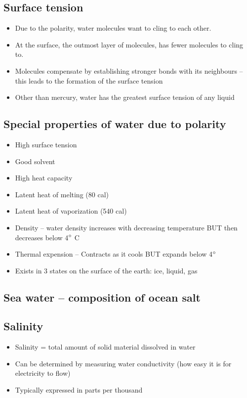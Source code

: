 \subsection{Surface tension}

\begin{itemize}
    \item Due to the polarity, water molecules want to cling
        to each other.
    \item At the surface, the outmost layer of molecules, has fewer
        molecules to cling to.
    \item Molecules compensate by establishing stronger bonds with its
        neighbours -- this leads to the formation of the surface tension
    \item Other than mercury, water has the greatest surface tension of
        any liquid
\end{itemize}

\subsection{Special properties of water due to polarity}

\begin{itemize}
    \item High surface tension
    \item Good solvent
    \item High heat capacity
    \item Latent heat of melting (80 cal)
    \item Latent heat of vaporization (540 cal)
    \item Density -- water density increases with decreasing temperature
        BUT then decreases below 4$\degree$ C
    \item Thermal expension -- Contracts as it cools BUT expands
        below 4$\degree$
    \item Exists in 3 states on the surface of the earth: ice, liquid, gas
\end{itemize}

\subsection{Sea water -- composition of ocean salt}

\subsection{Salinity}

\begin{itemize}
    \item Salinity = total amount of solid material dissolved in water
    \item Can be determined by measuring water conductivity (how easy
        it is for electricity to flow)
    \item Typically expressed in parts per thousand
\end{itemize}